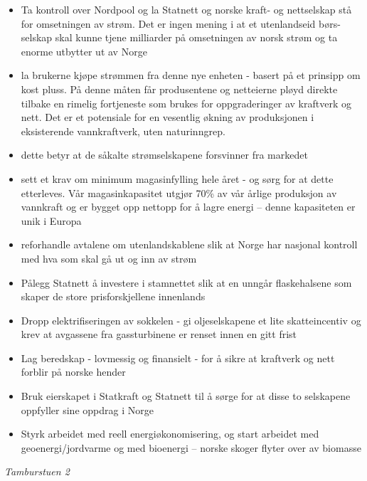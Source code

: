 \documentclass[
]{book}
\begin{document}
\begin{itemize}
\item
  Ta kontroll over Nordpool og la Statnett og norske kraft- og nettselskap stå for omsetningen av strøm. Det er ingen mening i at et utenlandseid børs-selskap skal kunne tjene milliarder på omsetningen av norsk strøm og ta enorme utbytter ut av Norge
\item
  la brukerne kjøpe strømmen fra denne nye enheten - basert på et prinsipp om kost pluss. På denne måten får produsentene og netteierne pløyd direkte tilbake en rimelig fortjeneste som brukes for oppgraderinger av kraftverk og nett. Det er et potensiale for en vesentlig økning av produksjonen i eksisterende vannkraftverk, uten naturinngrep.
\item
  dette betyr at de såkalte strømselskapene forsvinner fra markedet
\item
  sett et krav om minimum magasinfylling hele året - og sørg for at dette etterleves. Vår magasinkapasitet utgjør 70\% av vår årlige produksjon av vannkraft og er bygget opp nettopp for å lagre energi -- denne kapasiteten er unik i Europa
\item
  reforhandle avtalene om utenlandskablene slik at Norge har nasjonal kontroll med hva som skal gå ut og inn av strøm
\item
  Pålegg Statnett å investere i stamnettet slik at en unngår flaskehalsene som skaper de store prisforskjellene innenlands
\item
  Dropp elektrifiseringen av sokkelen - gi oljeselskapene et lite skatteincentiv og krev at avgassene fra gassturbinene er renset innen en gitt frist
\item
  Lag beredskap - lovmessig og finansielt - for å sikre at kraftverk og nett forblir på norske hender
\item
  Bruk eierskapet i Statkraft og Statnett til å sørge for at disse to selskapene oppfyller sine oppdrag i Norge
\item
  Styrk arbeidet med reell energiøkonomisering, og start arbeidet med geoenergi/jordvarme og med bioenergi -- norske skoger flyter over av biomasse
\end{itemize}

\emph{Tamburstuen 2}
\end{document}
